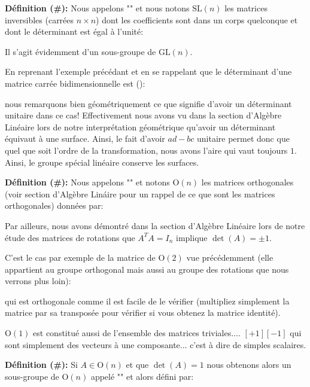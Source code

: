 	\textbf{Définition (\#\mydef):} Nous appelons "" et nous notons $\text{SL}(n)$ les matrices inversibles (carrées $n\times n$) dont les coefficients sont dans un corps quelconque et dont le déterminant est égal à l'unité:
	
	Il s'agit évidemment d'un sous-groupe de $\text{GL}(n)$.
	
	En reprenant l'exemple précédant et en se rappelant que le déterminant d'une matrice carrée bidimensionnelle est  ():
	
	nous remarquons bien géométriquement ce que signifie d'avoir un déterminant unitaire dans ce cas! Effectivement nous avons vu dans la section d'Algèbre Linéaire lors de notre interprétation géométrique qu'avoir un déterminant équivaut à une surface. Ainsi, le fait d'avoir $ad-bc$ unitaire permet donc que quel que soit l'ordre de la transformation, nous avons l'aire qui vaut toujours $1$. Ainsi, le groupe spécial linéaire conserve les surfaces.
	
	\textbf{Définition (\#\mydef):} Nous appelons "" et notons $\text{O}(n)$ les matrices orthogonales (voir section d'Algèbre Lináire pour un rappel de ce que sont les matrices orthogonales) données par:
	
	Par ailleurs, nous avons démontré dans la section d'Algèbre Linéaire lors de notre étude des matrices de rotations que $A^TA=I_n$  implique $\det(A)=\pm 1$.
	
	C'est le cas par exemple de la matrice de $\text{O}(2)$ vue précédemment (elle appartient au groupe orthogonal mais aussi au groupe des rotations que nous verrons plus loin):
	
	qui est orthogonale comme il est facile de le vérifier (multipliez simplement la matrice par sa transposée pour vérifier si vous obtenez la matrice identité).
	\begin{tcolorbox}[title=Remarque,colframe=black,arc=10pt]
	$\text{O}(1)$ est constitué aussi de l'ensemble des matrices triviales.... $[+1] [-1]$ qui sont simplement des vecteurs à une composante... c'est à dire de simples scalaires.
	\end{tcolorbox}
	\textbf{Définition (\#\mydef):} Si $A\in \text{O}(n)$ et que $\det(A)=1$ nous obtenons alors un sous-groupe de $\text{O}(n)$ appelé "\label{special real group orthogonal}" et alors défini par:
	
